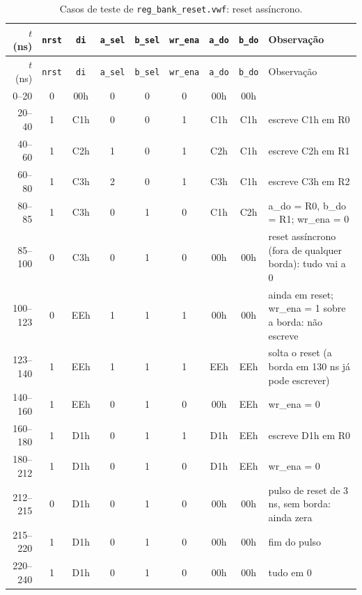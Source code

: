 {\scriptsize\setlength{\tabcolsep}{3pt}
\begin{longtable}{rcccccccp{5.3cm}}
\caption{Casos de teste de \texttt{reg\_bank\_reset.vwf}: reset assíncrono.}
\label{tab:caso-reg-bank-reset}\\
\hline $t$ (ns) & \texttt{nrst} & \texttt{di} & \texttt{a\_sel} & \texttt{b\_sel} & \texttt{wr\_ena} & \texttt{a\_do} & \texttt{b\_do} & Observação \\ \hline \endfirsthead
\hline $t$ (ns) & \texttt{nrst} & \texttt{di} & \texttt{a\_sel} & \texttt{b\_sel} & \texttt{wr\_ena} & \texttt{a\_do} & \texttt{b\_do} & Observação \\ \hline \endhead
0--20 & 0 & 00h & 0 & 0 & 0 & 00h & 00h &  \\
20--40 & 1 & C1h & 0 & 0 & 1 & C1h & C1h & escreve C1h em R0 \\
40--60 & 1 & C2h & 1 & 0 & 1 & C2h & C1h & escreve C2h em R1 \\
60--80 & 1 & C3h & 2 & 0 & 1 & C3h & C1h & escreve C3h em R2 \\
80--85 & 1 & C3h & 0 & 1 & 0 & C1h & C2h & a\_do = R0, b\_do = R1; wr\_ena = 0 \\
85--100 & 0 & C3h & 0 & 1 & 0 & 00h & 00h & reset assíncrono (fora de qualquer borda): tudo vai a 0 \\
100--123 & 0 & EEh & 1 & 1 & 1 & 00h & 00h & ainda em reset; wr\_ena = 1 sobre a borda: não escreve \\
123--140 & 1 & EEh & 1 & 1 & 1 & EEh & EEh & solta o reset (a borda em 130 ns já pode escrever) \\
140--160 & 1 & EEh & 0 & 1 & 0 & 00h & EEh & wr\_ena = 0 \\
160--180 & 1 & D1h & 0 & 1 & 1 & D1h & EEh & escreve D1h em R0 \\
180--212 & 1 & D1h & 0 & 1 & 0 & D1h & EEh & wr\_ena = 0 \\
212--215 & 0 & D1h & 0 & 1 & 0 & 00h & 00h & pulso de reset de 3 ns, sem borda: ainda zera \\
215--220 & 1 & D1h & 0 & 1 & 0 & 00h & 00h & fim do pulso \\
220--240 & 1 & D1h & 0 & 1 & 0 & 00h & 00h & tudo em 0 \\
\hline
\end{longtable}}
\vspace{-0.9cm}
